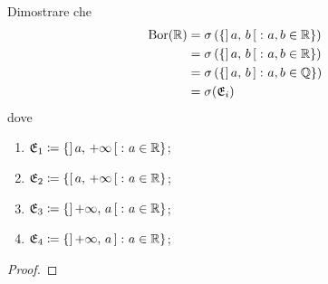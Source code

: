 \documentclass[../EserciziIstituzioniAnalisi.tex]{subfiles}
\begin{document}
\begin{exercise}[2016-10-10-1]
  Dimostrare che
  \begin{subequations}
    \begin{align}    
      \operatorname{Bor} (\mathbb R) & = \sigma \left(\left\{ \left]\,a,\,b\,\right[ \colon a, b \in \mathbb R \right\} \right) \\
      & = \sigma \left(\left\{\left]\,a,\,b\,\right[ \colon a, b \in \mathbb R \right\}\right) \\
      & = \sigma \left(\left\{\left]\,a,\,b\,\right] \colon a, b \in \mathbb Q \right\}\right) \\
      & = \sigma (\mathfrak E_i)
    \end{align}
  \end{subequations}
  dove
  \begin{enumerate}
    \item $\mathfrak E_{1}\coloneqq \{\left]\,a,\,+\infty\,\right[ \colon a \in \mathbb R\}$;
    \item $\mathfrak E_{2}\coloneqq \{\left[\,a,\,+\infty\,\right[ \colon a \in \mathbb R\}$;
    \item $\mathfrak E_{3}\coloneqq \{\left]\,+\infty,\,a\,\right[ \colon a \in \mathbb R\}$;
    \item $\mathfrak E_{4}\coloneqq \{\left]\,+\infty,\,a\,\right] \colon a \in \mathbb R\}$;
  \end{enumerate}
\end{exercise}
\begin{proof}
  
\end{proof}
\end{document}
